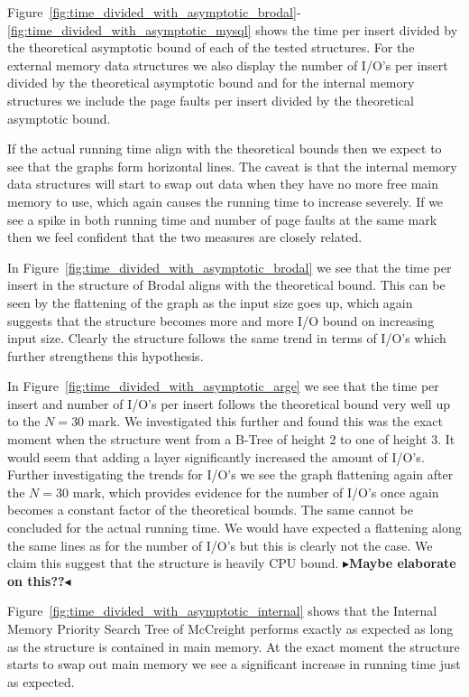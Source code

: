 \documentclass[twoside,11pt,openright]{report}
\newcommand{\todo}[1]{{\color[rgb]{.5,0,0}\textbf{$\blacktriangleright$#1$\blacktriangleleft$}}}
\begin{document}
Figure~\ref{fig:time_divided_with_asymptotic_brodal}-\ref{fig:time_divided_with_asymptotic_mysql} shows the time per insert divided by the theoretical asymptotic bound of each of the tested structures. For the external memory data structures we also display the number of I/O's per insert divided by the theoretical asymptotic bound and for the internal memory structures we include the page faults per insert divided by the theoretical asymptotic bound. 

If the actual running time align with the theoretical bounds then we expect to see that the graphs form horizontal lines. The caveat is that the internal memory data structures will start to swap out data when they have no more free main memory to use, which again causes the running time to increase severely. If we see a spike in both running time and number of page faults at the same mark then we feel confident that the two measures are closely related.

In Figure~\ref{fig:time_divided_with_asymptotic_brodal} we see that the time per insert in the structure of Brodal aligns with the theoretical bound. This can be seen by the flattening of the graph as the input size goes up, which again suggests that the structure becomes more and more I/O bound on increasing input size. Clearly the structure follows the same trend in terms of I/O's which further strengthens this hypothesis.

In Figure~\ref{fig:time_divided_with_asymptotic_arge} we see that the time per insert and number of I/O's per insert follows the theoretical bound very well up to the $N = 30$ mark. We investigated this further and found this was the exact moment when the structure went from a B-Tree of height 2 to one of height 3. It would seem that adding a layer significantly increased the amount of I/O's. Further investigating the trends for I/O's we see the graph flattening again after the $N = 30$ mark, which provides evidence for the number of I/O's once again becomes a constant factor of the theoretical bounds. The same cannot be concluded for the actual running time. We would have expected a flattening along the same lines as for the number of I/O's but this is clearly not the case. We claim this suggest that the structure is heavily CPU bound. \todo{Maybe elaborate on this??}

Figure~\ref{fig:time_divided_with_asymptotic_internal} shows that the Internal Memory Priority Search Tree of McCreight performs exactly as expected as long as the structure is contained in main memory. At the exact moment the structure starts to swap out main memory we see a significant increase in running time just as expected.
\end{document}
